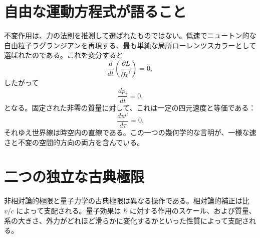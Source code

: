 \section{自由な運動方程式が語ること}

不変作用は、力の法則を推測して選ばれたものではない。低速でニュートン的な自由粒子ラグランジアンを再現する、最も単純な局所ローレンツスカラーとして選ばれたのである。これを変分すると
\begin{equation}
\frac{d}{dt}\left(\frac{\partial L}{\partial\dot x^i}\right)=0,
\end{equation}
したがって
\begin{equation}
\frac{dp_i}{dt}=0.
\end{equation}
となる。固定された非零の質量に対して、これは一定の四元速度と等価である：
\begin{equation}
\frac{du^\mu}{d\tau}=0.
\end{equation}
それゆえ世界線は時空内の直線である。この一つの幾何学的な言明が、一様な速さと不変の空間的方向の両方を含んでいる。

\begin{classroomqa}
\end{classroomqa}

\section{二つの独立な古典極限}

非相対論的極限と量子力学の古典極限は異なる操作である。相対論的補正は比 \(v/c\) によって支配される。量子効果は \(\hbar\) に対する作用のスケール、および質量、系の大きさ、外力がどれほど滑らかに変化するかといった性質によって支配される。

\begin{classroomqa}
\end{classroomqa}

